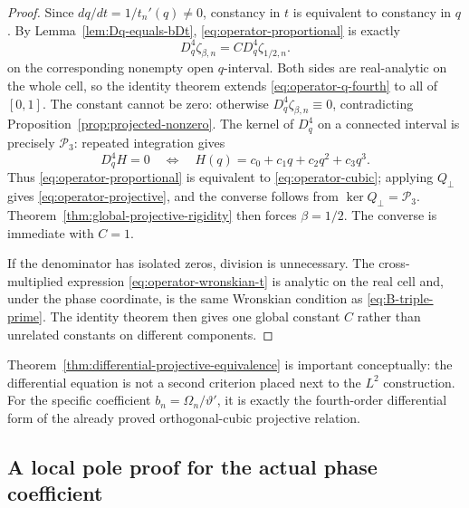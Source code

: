 \documentclass[11pt]{amsart}
\numberwithin{equation}{section}
\newcommand{\Pcal}{\mathcal P}
\begin{document}
\begin{proof}
Since $dq/dt=1/t_n'(q)\neq0$, constancy in $t$ is equivalent to constancy
in $q$.  By Lemma~\ref{lem:Dq-equals-bDt},
\eqref{eq:operator-proportional} is exactly
\begin{equation}
 D_q^4\zeta_{\beta,n}=C D_q^4\zeta_{1/2,n}.
 \label{eq:operator-q-fourth}
\end{equation}
on the corresponding nonempty open $q$-interval.  Both sides are
real-analytic on the whole cell, so the identity theorem extends
\eqref{eq:operator-q-fourth} to all of $[0,1]$.  The constant cannot be
zero: otherwise $D_q^4\zeta_{\beta,n}\equiv0$, contradicting
Proposition~\ref{prop:projected-nonzero}.  The kernel of $D_q^4$ on a
connected interval is precisely $\Pcal_3$:
repeated integration gives
\begin{equation}
 D_q^4H=0
 \quad\Longleftrightarrow\quad
 H(q)=c_0+c_1q+c_2q^2+c_3q^3.
 \label{eq:kernel-Dq4-P3}
\end{equation}
Thus \eqref{eq:operator-proportional} is equivalent to
\eqref{eq:operator-cubic}; applying $Q_\perp$ gives
\eqref{eq:operator-projective}, and the converse follows from
$\ker Q_\perp=\Pcal_3$.  Theorem~\ref{thm:global-projective-rigidity} then
forces $\beta=1/2$.  The converse is immediate with $C=1$.

If the denominator has isolated zeros, division is unnecessary.  The
cross-multiplied expression \eqref{eq:operator-wronskian-t} is analytic on
the real cell and, under the phase coordinate, is the same Wronskian
condition as \eqref{eq:B-triple-prime}.  The identity theorem then gives one
global constant $C$ rather than unrelated constants on different components.
\end{proof}

Theorem~\ref{thm:differential-projective-equivalence} is important
conceptually: the differential equation is not a second criterion placed next
to the $L^2$ construction.  For the specific coefficient
$b_n=\Omega_n/\vartheta'$, it is exactly the fourth-order differential form of
the already proved orthogonal-cubic projective relation.

\subsection{A local pole proof for the actual phase coefficient}
\label{subsec:actual-bn-pole}
\end{document}
